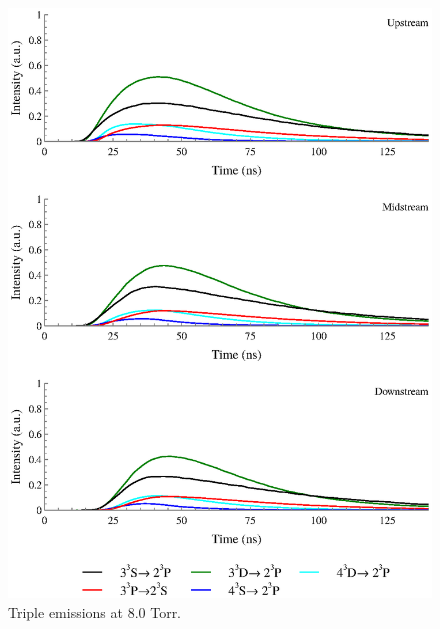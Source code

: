 \begin{figure}
  \centering
  \includegraphics{./chapters/extraem/figures/8torr_t.eps}
  \caption{Triple emissions at 8.0 Torr.}
\end{figure}

